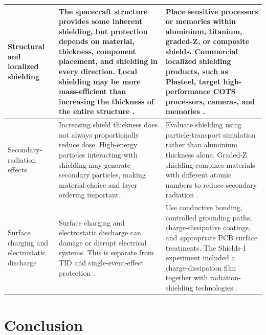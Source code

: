 \documentclass[10pt]{../datasheet}
\let\cite\citep
\begin{document}
\begin{longtable}{|p{3.5cm}|p{6.5cm}|p{6.5cm}|}
  Structural and localized shielding           &
  The spacecraft structure provides some inherent shielding, but protection
  depends on material, thickness, component placement, and shielding in every
  direction. Local shielding may be more mass-efficient than increasing the
  thickness of the entire structure
  \cite[pp.~176--179]{nasa_soa_2022}
  \cite[pp.~190--194]{nasa_soa_2023}
  \cite[pp.~193--196]{nasa_soa_2024}
  \cite[pp.~190--193]{nasa_soa_2026}.          &
  Place sensitive processors or memories within aluminium, titanium, graded-Z,
  or composite shields. Commercial localized shielding products, such as
  Plasteel, target high-performance COTS processors, cameras, and memories
  \cite{cosmic_plasteel,shields1_radiation_experiment}.                     \\ \hline

  Secondary-radiation effects                  &
  Increasing shield thickness does not always proportionally reduce dose.
  High-energy particles interacting with shielding may generate secondary
  particles, making material choice and layer ordering important
  \cite[pp.~176--179]{nasa_soa_2022}
  \cite[pp.~193--196]{nasa_soa_2024}
  \cite[pp.~190--193]{nasa_soa_2026}.          &
  Evaluate shielding using particle-transport simulation rather than aluminium
  thickness alone. Graded-Z shielding combines materials with different atomic
  numbers to reduce secondary radiation
  \cite{shields1_radiation_experiment}.                                     \\ \hline

  Surface charging and electrostatic discharge &
  Surface charging and electrostatic discharge can damage or disrupt electrical
  systems. This is separate from TID and single-event-effect protection
  \cite[p.~179]{nasa_soa_2022}
  \cite[p.~194]{nasa_soa_2023}
  \cite[pp.~196--197]{nasa_soa_2024}
  \cite[p.~193]{nasa_soa_2026}.                &
  Use conductive bonding, controlled grounding paths, charge-dissipative
  coatings, and appropriate PCB surface treatments. The Shields-1 experiment
  included a charge-dissipation film together with radiation-shielding
  technologies
  \cite{shields1_radiation_experiment}.                                     \\ \hline
\end{longtable}



\section{Conclusion}
\end{document}
